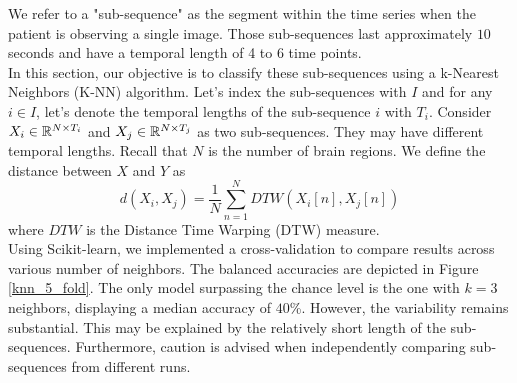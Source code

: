 We refer to a "sub-sequence" as the segment within the time series when the patient is observing a single image. Those sub-sequences last approximately $10$ seconds and have a temporal length of 4 to 6 time points. \\ 
In this section, our objective is to classify these sub-sequences using a k-Nearest Neighbors (K-NN) algorithm. Let's index the sub-sequences with $I$ and for any $i\in I$, let's denote the temporal lengths of the sub-sequence $i$ with $T_i$. Consider $X_i\in\mathbb{R}^{N\times T_i}$ and $X_j\in\mathbb{R}^{N\times T_j}$ as two sub-sequences. They may have different temporal lengths. Recall that $N$ is the number of brain regions. We define the distance between $X$ and $Y$ as
$$
d(X_i, X_j) = \frac{1}{N}\sum_{n=1}^N DTW(X_i[n], X_j[n])
$$
where $DTW$ is the Distance Time Warping (DTW) measure. \\
Using Scikit-learn, we implemented a cross-validation to compare results across various number of neighbors. The balanced accuracies are depicted in Figure \ref{knn_5_fold}. The only model surpassing the chance level is the one with $k=3$ neighbors, displaying a median accuracy of $40$\%. However, the variability remains substantial. This may be explained by the relatively short length of the sub-sequences. Furthermore, caution is advised when independently comparing sub-sequences from different runs.